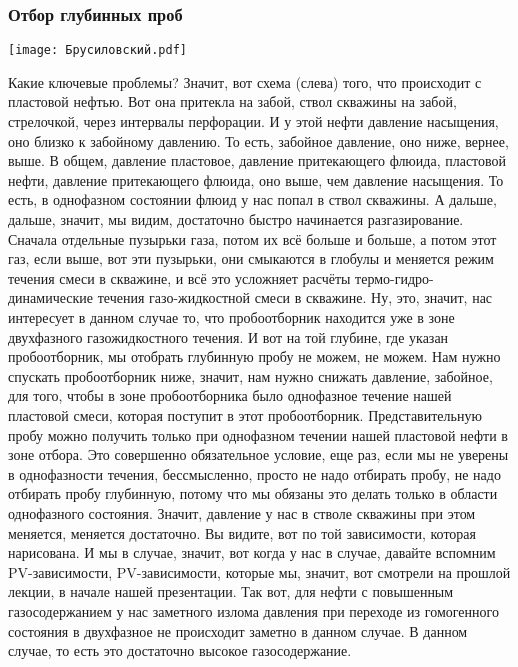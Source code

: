 \documentclass[main.tex]{subfiles}
\begin{document}
\subsubsection{Отбор глубинных проб}

\begin{center}
\texttt{[image: Брусиловский.pdf]}
\end{center}

Какие ключевые проблемы?
Значит, вот схема (слева) того, что происходит с пластовой нефтью.
Вот она притекла на забой, ствол скважины на забой, стрелочкой, через интервалы перфорации.
И у этой нефти давление насыщения, оно близко к забойному давлению.
То есть, забойное давление, оно ниже, вернее, выше.
В общем, давление пластовое, давление притекающего флюида, пластовой нефти, давление притекающего флюида, оно выше, чем давление насыщения.
То есть, в однофазном состоянии флюид у нас попал в ствол скважины.
А дальше, дальше, значит, мы видим, достаточно быстро начинается разгазирование.
Сначала отдельные пузырьки газа, потом их всё больше и больше, а потом этот газ, если выше, вот эти пузырьки, они смыкаются в глобулы и меняется режим течения смеси в скважине, и всё это усложняет расчёты термо-гидро-динамические течения газо-жидкостной смеси в скважине.
Ну, это, значит, нас интересует в данном случае то, что пробоотборник находится уже в зоне двухфазного газожидкостного течения.
И вот на той глубине, где указан пробоотборник, мы отобрать глубинную пробу не можем, не можем.
Нам нужно спускать пробоотборник ниже, значит, нам нужно снижать давление, забойное, для того, чтобы в зоне пробоотборника было однофазное течение нашей пластовой смеси, которая поступит в этот пробоотборник.
Представительную пробу можно получить только при однофазном течении нашей пластовой нефти в зоне отбора.
Это совершенно обязательное условие, еще раз, если мы не уверены в однофазности течения, бессмысленно, просто не надо отбирать пробу, не надо отбирать пробу глубинную, потому что мы обязаны это делать только в области однофазного состояния.
Значит, давление у нас в стволе скважины при этом меняется, меняется достаточно.
Вы видите, вот по той зависимости, которая нарисована.
И мы в случае, значит, вот когда у нас в случае, давайте вспомним PV-зависимости, PV-зависимости, которые мы, значит, вот смотрели на прошлой лекции, в начале нашей презентации.
Так вот, для нефти с повышенным газосодержанием у нас заметного излома давления при переходе из гомогенного состояния в двухфазное не происходит заметно в данном случае.
В данном случае, то есть это достаточно высокое газосодержание.
\end{document}
